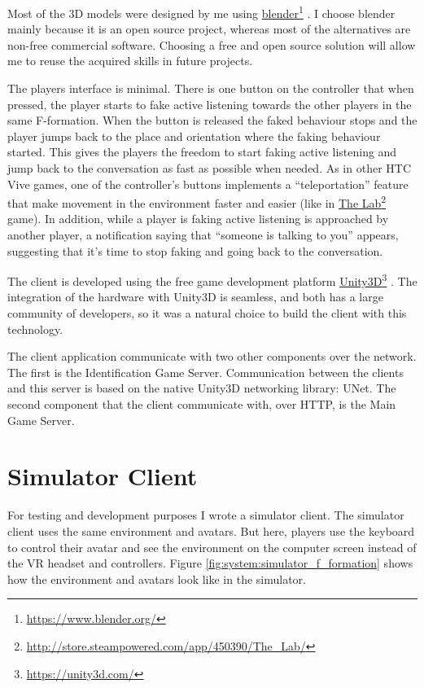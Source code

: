 \documentclass[]{simple-thesis}
\newcommand\fnurl[2]{%
  \href{#2}{#1}\footnote{\url{#2}}%
}
\begin{document}
Most of the 3D models were designed by me using \fnurl{blender}{https://www.blender.org/}.
I choose blender mainly because it is an open source project, whereas most of the alternatives are non-free commercial software.
Choosing a free and open source solution will allow me to reuse the acquired skills in future projects.

The players interface is minimal.
There is one button on the controller that when pressed, the player starts to fake active listening towards the other players in the same F-formation.
When the button is released the faked behaviour stops and the player jumps back to the place and orientation where the faking behaviour started.
This gives the players the freedom to start faking active listening and jump back to the conversation as fast as possible when needed.
As in other HTC Vive games, one of the controller's buttons implements a ``teleportation'' feature that make movement in the environment faster and easier (like in \fnurl{The Lab}{http://store.steampowered.com/app/450390/The_Lab/} game).
In addition, while a player is faking active listening is approached by another player, a notification saying that ``someone is talking to you'' appears, suggesting that it's time to stop faking and going back to the conversation.

The client is developed using the free game development platform \fnurl{Unity3D}{https://unity3d.com/}.
The integration of the hardware with Unity3D is seamless, and both has a large community of developers, so it was a natural choice to build the client with this technology.

The client application communicate with two other components over the network.
The first is the Identification Game Server.
Communication between the clients and this server is based on the native Unity3D networking library: UNet.
The second component that the client communicate with, over HTTP, is the Main Game Server.

\section{Simulator Client}

For testing and development purposes I wrote a simulator client.
The simulator client uses the same environment and avatars.
But here, players use the keyboard to control their avatar and see the environment on the computer screen instead of the VR headset and controllers.
Figure \ref{fig:system:simulator_f_formation} shows how the environment and avatars look like in the simulator.
\end{document}
